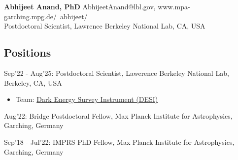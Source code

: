 \documentclass[12pt,letterpaper]{article}
\begin{document}
\thispagestyle{empty}\sloppy\sloppypar\raggedbottom

\textbf{\Large Abhijeet Anand, PhD} \hfill
\textsf{\small AbhijeetAnand@lbl.gov, www.mpa-garching.mpg.de/~abhijeet/}\\[0.3ex]
Postdoctoral Scientist, Lawrence Berkeley National Lab, CA, USA\\[0.5ex]

\subsection{Positions}
\begin{list}{}{\cvlist}
\item Sep'22 - Aug'25: Postdoctoral Scientist, Lawerence Berkeley National Lab, Berkeley, CA, USA \\
\begin{itemize}
  \item[] Team: \href{https://www.desi.lbl.gov/}{Dark Energy Survey Instrument (DESI)}
\end{itemize}
\item Aug'22: Bridge Postdoctoral Fellow, Max Planck Institute for Astrophysics, Garching, Germany
\item Sep'18 - Jul'22: IMPRS PhD Fellow, Max Planck Institute for Astrophysics, Garching, Germany
\end{list}
\end{document}
